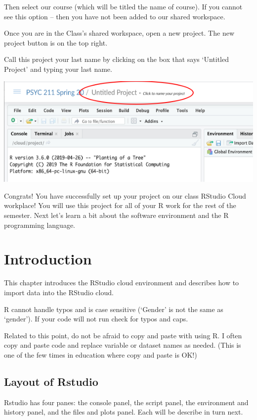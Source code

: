 \documentclass[
]{book}
\begin{document}
Then select our course (which will be titled the name of course). If you cannot see this option -- then you have not been added to our shared workspace.

Once you are in the Class's shared workspace, open a new project. The new project button is on the top right.

Call this project your last name by clicking on the box that says `Untitled Project' and typing your last name.

\includegraphics{img/Projname.png}

Congrats! You have successfully set up your project on our class RStudio Cloud workplace! You will use this project for all of your R work for the rest of the semester. Next let's learn a bit about the software environment and the R programming language.

\hypertarget{introduction}{%
\chapter{Introduction}\label{introduction}}

This chapter introduces the RStudio cloud environment and describes how to import data into the RStudio cloud.

R cannot handle typos and is case sensitive (`Gender' is not the same as `gender'). If your code will not run check for typos and caps.

Related to this point, do not be afraid to copy and paste with using R. I often copy and paste code and replace variable or dataset names as needed. (This is one of the few times in education where copy and paste is OK!)

\hypertarget{layout-of-rstudio}{%
\section{Layout of Rstudio}\label{layout-of-rstudio}}

Rstudio has four panes: the console panel, the script panel, the environment and history panel, and the files and plots panel. Each will be describe in turn next.
\end{document}
